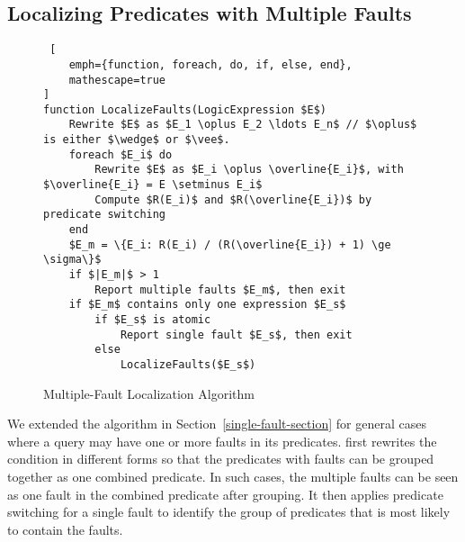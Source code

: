 \subsection{Localizing Predicates with Multiple Faults}

\begin{figure}[t]
    \centering
\begin{lstlisting} [
    emph={function, foreach, do, if, else, end},
	mathescape=true
]
function LocalizeFaults(LogicExpression $E$)
    Rewrite $E$ as $E_1 \oplus E_2 \ldots E_n$ // $\oplus$ is either $\wedge$ or $\vee$.
    foreach $E_i$ do
        Rewrite $E$ as $E_i \oplus \overline{E_i}$, with $\overline{E_i} = E \setminus E_i$
        Compute $R(E_i)$ and $R(\overline{E_i})$ by predicate switching
    end
    $E_m = \{E_i: R(E_i) / (R(\overline{E_i}) + 1) \ge \sigma\}$
    if $|E_m|$ > 1
        Report multiple faults $E_m$, then exit
    if $E_m$ contains only one expression $E_s$
        if $E_s$ is atomic
            Report single fault $E_s$, then exit
        else
            LocalizeFaults($E_s$)
\end{lstlisting}
     \caption{Multiple-Fault Localization Algorithm}
     \label{fig:algorithm-multiplefaults}
\end{figure}


We extended the algorithm in Section~\ref{single-fault-section} for general cases
where a query may have one or more faults in its
predicates. \tool{} first rewrites the  condition
in different forms so that the predicates with faults can be grouped
together as one combined predicate. In such cases, the multiple faults
can be seen as one fault in the combined predicate after grouping. It
then applies predicate switching for a single fault to identify the
group of predicates that is most likely to contain the faults.

